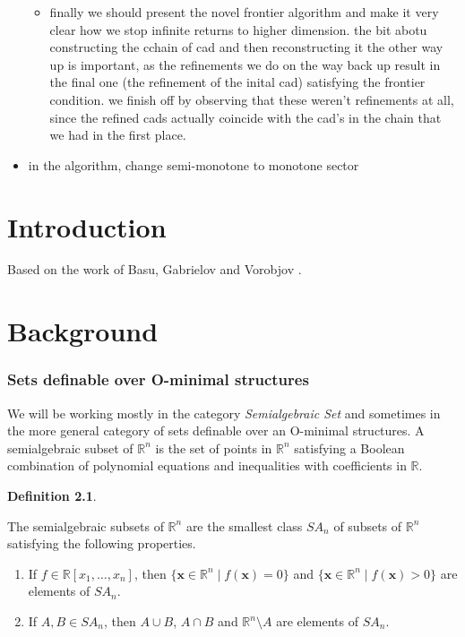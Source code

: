 \documentclass[
]{book}
\providecommand{\tightlist}{%
  \setlength{\itemsep}{0pt}\setlength{\parskip}{0pt}}
\theoremstyle{definition}
\newtheorem{definition}{Definition}[chapter]
\theoremstyle{definition}
\theoremstyle{definition}
\theoremstyle{definition}
\theoremstyle{remark}
\begin{document}
\begin{itemize}
\begin{itemize}
  \item
    finally we should present the novel frontier algorithm and make it very clear how we stop infinite returns to higher dimension. the bit abotu constructing the cchain of cad and then reconstructing it the other way up is important, as the refinements we do on the way back up result in the final one (the refinement of the inital cad) satisfying the frontier condition. we finish off by observing that these weren't refinements at all, since the refined cads actually coincide with the cad's in the chain that we had in the first place.
  \end{itemize}
\item
  in the algorithm, change semi-monotone to monotone sector
\end{itemize}

\hypertarget{intro}{%
\chapter{Introduction}\label{intro}}

Based on the work of Basu, Gabrielov and Vorobjov \citep{bgv15}.

\hypertarget{background}{%
\chapter{Background}\label{background}}

\hypertarget{sets-definable-over-o-minimal-structures}{%
\subsection{Sets definable over O-minimal structures}\label{sets-definable-over-o-minimal-structures}}

We will be working mostly in the category \emph{Semialgebraic Set} and sometimes in the more general category of sets definable over an O-minimal structures.
A semialgebraic subset of \(\mathbb{R}^n\) is the set of points in \(\mathbb{R}^n\) satisfying a Boolean combination of polynomial equations and inequalities with coefficients in \(\mathbb{R}\).

\begin{definition}
\protect\hypertarget{def:semialgebraic-set}{}\label{def:semialgebraic-set}

The semialgebraic subsets of \(\mathbb{R}^n\) are the smallest class \({SA}_n\) of subsets of \(\mathbb{R}^n\) satisfying the following properties.

\begin{enumerate}
\def\labelenumi{\arabic{enumi}.}
\tightlist
\item
  If \(f \in \mathbb{R}[x_1,\ldots,x_n]\), then \(\{ \mathbf{x} \in \mathbb{R}^n \mid f(\mathbf{x}) = 0 \}\) and \(\{ \mathbf{x} \in \mathbb{R}^n \mid f(\mathbf{x}) > 0 \}\) are elements of \({SA}_n\).
\item
  If \(A, B \in {SA}_n\), then \(A \cup B\), \(A \cap B\) and \(\mathbb{R}^n \setminus A\) are elements of \({SA}_n\).
\end{enumerate}

\end{definition}
\end{document}

